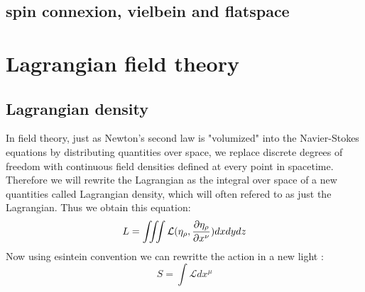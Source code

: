 \documentclass{article}
\begin{document}
\subsection{spin connexion, vielbein and flatspace}


\section{Lagrangian field theory}
\subsection{Lagrangian density}
In field theory, just as Newton's second law is "volumized" into the Navier-Stokes equations by distributing quantities over space, 
we replace discrete degrees of freedom with continuous field densities defined at every point in spacetime.
Therefore we will rewrite the Lagrangian as the integral over space of a new quantities called Lagrangian density, which will often refered to as just the Lagrangian.
Thus we obtain this equation:
\begin{equation}
    L = \iiint \mathcal{L}(\eta_{\rho},\pdv{\eta_{\rho}}{x^{\nu}}) dx dy dz
\end{equation}
Now using esintein convention we can rewritte the action in a new light :
\begin{equation}
    S = \int \mathcal{L} dx^\mu
\end{equation}
\end{document}
